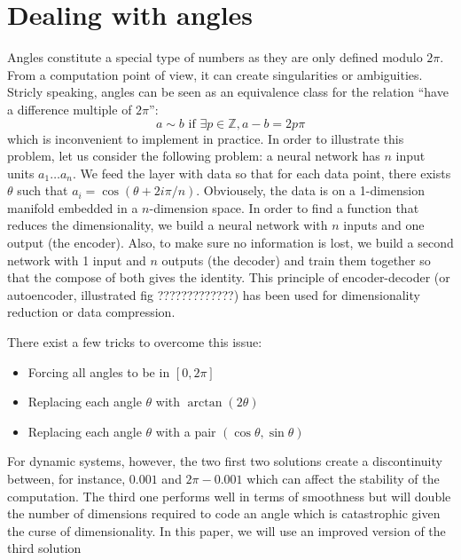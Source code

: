 \section{Dealing with angles}

Angles constitute a special type of numbers as they are only defined modulo $2\pi$. From a computation point of view, it can create singularities or ambiguities. Stricly speaking, angles can be seen as an equivalence class for the relation \textquotedblleft have a difference multiple of $2\pi$\textquotedblright:
$$ a \sim b \text{ if } \exists p \in \mathbb{Z}, a-b = 2 p \pi $$
which is inconvenient to implement in practice. In order to illustrate this problem, let us consider the following problem: a neural network has $n$ input units $a_1 \dots a_n$. We feed the layer with data so that for each data point, there exists $\theta$ such that $a_i = \cos(\theta+2i\pi/n)$. Obviousely, the data is on a 1-dimension manifold embedded in a $n$-dimension space. In order to find a function that reduces the dimensionality, we build a neural network with $n$ inputs and one output (the encoder). Also, to make sure no information is lost, we build a second network with 1 input and $n$ outputs (the decoder) and train them together so that the compose of both gives the identity. This principle of encoder-decoder (or autoencoder, illustrated fig ?????????????) has been used for dimensionality reduction or data compression.



There exist a few tricks to overcome this issue:
\begin{itemize}
 \item Forcing all angles to be in $[0, 2 \pi]$
 \item Replacing each angle $\theta$ with $\arctan(2\theta)$
 \item Replacing each angle $\theta$ with a pair $(\cos\theta, \sin\theta)$
\end{itemize}
For dynamic systems, however, the two first two solutions create a discontinuity between, for instance, $0.001$ and $2\pi-0.001$ which can affect the stability of the computation. The third one performs well in terms of smoothness but will double the number of dimensions required to code an angle which is catastrophic given the curse of dimensionality. In this paper, we will use an improved version of the third solution